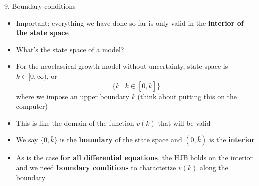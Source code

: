 \documentclass[11pt, aspectratio=169]{beamer}
\begin{document}
\begin{frame}{9. Boundary conditions}

{\small
\begin{itemize}
\item Important: everything we have done so far is only valid in the \textbf{interior of the state space}

\item What's the state space of a model? 

\item For the neoclassical growth model without uncertainty, state space is $k \in [0, \infty)$, or 
\begin{equation*}
	\Big\{ k \mid k \in [0, \bar k] \Big\}
\end{equation*}
where we impose an upper boundary $\bar k$ (think about putting this on the computer)

\item This is like the domain of the function $v(k)$ that will be valid 

\item We say $\{ 0, \bar k \}$ is the \textbf{boundary} of the state space and $(0, \bar k)$ is the \textbf{interior}

\item As is the case \textbf{for all differential equations}, the HJB holds on the interior and we need \textbf{boundary conditions} to characterize $v(k)$ along the boundary 
\end{itemize}
}
\end{frame}
\end{document}
